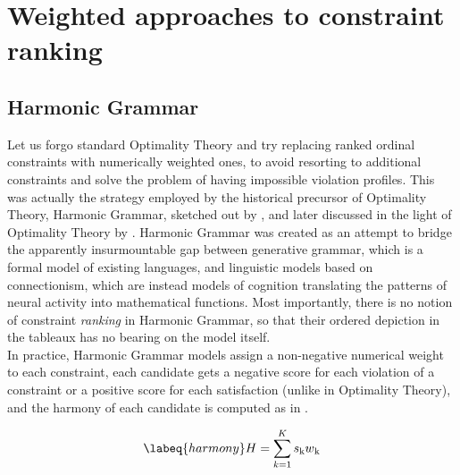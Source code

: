\section{Weighted approaches to constraint ranking} 

\subsection{Harmonic Grammar}  %
Let us forgo standard Optimality Theory and try replacing ranked ordinal constraints with numerically weighted ones, to avoid resorting to additional constraints and solve the problem of having impossible violation profiles. 
This was actually the strategy employed by the historical precursor of Optimality Theory, Harmonic Grammar, sketched out by \textcite{smolensky1993integrating, legendre1990can, legendre1991unifying}, and later discussed in the light of Optimality Theory by \textcite{legendre2006optimality, pater2009weighted}. Harmonic Grammar was created as an attempt to bridge the apparently insurmountable gap between generative grammar, which is a formal model of existing languages, and linguistic models based on connectionism, which are instead models of cognition translating the patterns of neural activity into mathematical functions. Most importantly, there is no notion of constraint \textit{ranking} in Harmonic Grammar, so that their ordered depiction in the tableaux has no bearing on the model itself.\\
In practice, Harmonic Grammar models assign a non-negative numerical weight to each constraint, each candidate gets a negative score for each violation of a constraint or a positive score for each satisfaction (unlike in Optimality Theory), and the harmony of each candidate is computed as in . 

\begin{equation} \labeq{harmony} %
H = \sum_{k=1}^{K} s\textsubscript{k} w\textsubscript{k}
\end{equation}

